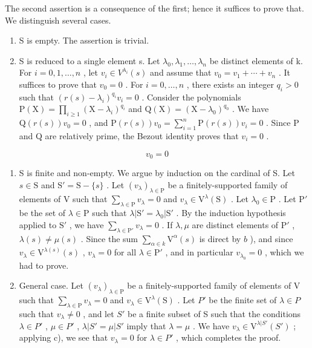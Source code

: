 The second assertion is a consequence of the first; hence it suffices to prove that. We distinguish several cases.

\begin{enumerate}
\def\labelenumi{\alph{enumi})}
\item
  S is empty. The assertion is trivial.
\item
  S is reduced to a single element s. Let \(\lambda_{0}, \lambda_{1}, \ldots, \lambda_{n}\) be distinct elements of k. For \(i = 0, 1, \ldots, n\) , let \(v_{i} \in V^{\lambda_{i}}(s)\) and assume that \(v_{0} = v_{1} + \cdots + v_{n}\) . It suffices to prove that \(v_{0} = 0\) . For \(i = 0, \ldots, n\) , there exists an integer \(q_{i} > 0\) such that \((r(s) - \lambda_{i})^{q_{i}} v_{i} = 0\) . Consider the polynomials \(\mathrm{P}(\mathrm{X}) = \prod_{i \geq 1} (\mathrm{X} - \lambda_{i})^{q_{i}}\) and \(\mathrm{Q}(\mathrm{X}) = (\mathrm{X} - \lambda_{0})^{q_{0}}\) . We have \(\mathrm{Q}(r(s)) v_{0} = 0\) , and \(\mathrm{P}(r(s)) v_{0} = \sum_{i=1}^{n} \mathrm{P}(r(s)) v_{i} = 0\) . Since P and Q are relatively prime, the Bezout identity proves that \(v_{i} = 0\) .
\end{enumerate}

\[
v _ {0} = 0
\]

\begin{enumerate}
\def\labelenumi{\alph{enumi})}
\setcounter{enumi}{2}
\item
  S is finite and non-empty. We argue by induction on the cardinal of S. Let \(s \in \mathrm{S}\) and \(\mathrm{S}' = \mathrm{S} - \{s\}\) . Let \((v_{\lambda})_{\lambda \in \mathrm{P}}\) be a finitely-supported family of elements of V such that \(\sum_{\lambda \in \mathrm{P}} v_{\lambda} = 0\) and \(v_{\lambda} \in \mathrm{V}^{\lambda}(\mathrm{S})\) . Let \(\lambda_0 \in \mathrm{P}\) . Let \(\mathrm{P}'\) be the set of \(\lambda \in \mathrm{P}\) such that \(\lambda |\mathrm{S}' = \lambda_0|\mathrm{S}'\) . By the induction hypothesis applied to \(\mathrm{S}'\) , we have \(\sum_{\lambda \in \mathrm{P}'} v_{\lambda} = 0\) . If \(\lambda, \mu\) are distinct elements of \(\mathrm{P}'\) , \(\lambda(s) \neq \mu(s)\) . Since the sum \(\sum_{\alpha \in k} \mathrm{V}^{\alpha}(s)\) is direct by \(b\) ), and since \(v_{\lambda} \in \mathrm{V}^{\lambda(s)}(s)\) , \(v_{\lambda} = 0\) for all \(\lambda \in \mathrm{P}'\) , and in particular \(v_{\lambda_0} = 0\) , which we had to prove.
\item
  General case. Let \((v_{\lambda})_{\lambda\in\mathrm{P}}\) be a finitely-supported family of elements of V such that \(\sum_{\lambda\in\mathrm{P}} v_{\lambda}=0\) and \(v_{\lambda}\in\mathrm{V}^{\lambda}(\mathrm{S})\) . Let \(P'\) be the finite set of \(\lambda\in P\) such that \(v_{\lambda}\neq0\) , and let \(S'\) be a finite subset of S such that the conditions \(\lambda\in P'\) , \(\mu\in P'\) , \(\lambda|S'= \mu|S'\) imply that \(\lambda=\mu\) . We have \(v_{\lambda}\in\mathrm{V}^{\lambda|S'}(S')\) ; applying c), we see that \(v_{\lambda}=0\) for \(\lambda\in P'\) , which completes the proof.
\end{enumerate}

